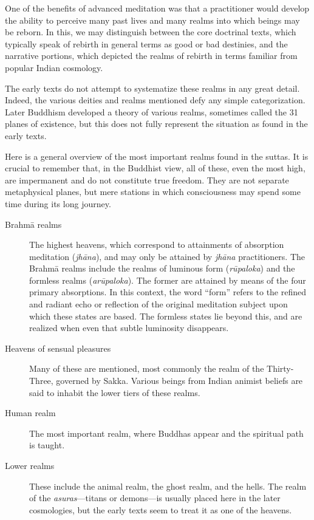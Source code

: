 \documentclass[12pt,openany]{book}%
\begin{document}
One of the benefits of advanced meditation was that a practitioner would develop the ability to perceive many past lives and many realms into which beings may be reborn. In this, we may distinguish between the core doctrinal texts, which typically speak of rebirth in general terms as good or bad destinies, and the narrative portions, which depicted the realms of rebirth in terms familiar from popular Indian cosmology.

The early texts do not attempt to systematize these realms in any great detail. Indeed, the various deities and realms mentioned defy any simple categorization. Later Buddhism developed a theory of various realms, sometimes called the 31 planes of existence, but this does not fully represent the situation as found in the early texts.

Here is a general overview of the most important realms found in the suttas. It is crucial to remember that, in the Buddhist view, all of these, even the most high, are impermanent and do not constitute true freedom. They are not separate metaphysical planes, but mere stations in which consciousness may spend some time during its long journey.

\begin{description}%
\item[\textsanskrit{Brahmā} realms] The highest heavens, which correspond to attainments of absorption meditation (\textit{\textsanskrit{jhāna}}), and may only be attained by \textit{\textsanskrit{jhāna}} practitioners. The \textsanskrit{Brahmā} realms include the realms of luminous form (\textit{\textsanskrit{rūpaloka}}) and the formless realms (\textit{\textsanskrit{arūpaloka}}). The former are attained by means of the four primary absorptions. In this context, the word “form” refers to the refined and radiant echo or reflection of the original meditation subject upon which these states are based. The formless states lie beyond this, and are realized when even that subtle luminosity disappears.%
\item[Heavens of sensual pleasures] Many of these are mentioned, most commonly the realm of the Thirty-Three, governed by Sakka. Various beings from Indian animist beliefs are said to inhabit the lower tiers of these realms.%
\item[Human realm] The most important realm, where Buddhas appear and the spiritual path is taught.%
\item[Lower realms] These include the animal realm, the ghost realm, and the hells. The realm of the \textit{asuras}—titans or demons—is usually placed here in the later cosmologies, but the early texts seem to treat it as one of the heavens.%
\end{description}
\end{document}
